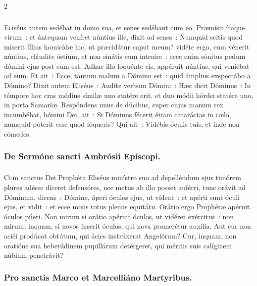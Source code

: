 \documentclass[9pt,twoside]{extarticle}
\begin{document}
\begin{multicols}{2}
{\subsubsection*{\center {}}
\lettrine{E}liséus autem sedébat in domo sua, et senes sedébant cum eo. Præmísit ítaque virum~: et ántequam veníret núntius ille, dixit ad senes~: Numquid scitis quod míserit fílius homicídæ hic, ut præcidátur caput meum? vidéte ergo, cum vénerit núntius, cláudite óstium, et non sinátis eum introíre~: ecce enim sónitus pedum dómini ejus post eum est.
Adhuc illo loquénte eis, appáruit núntius, qui veniébat ad eum. Et ait~: Ecce, tantum malum a Dómino est~: quid ámplius exspectábo a Dómino?
Dixit autem Eliséus~: Audíte verbum Dómini~: Hæc dicit Dóminus~: In témpore hoc cras módius símilæ uno statére erit, et duo módii hórdei statére uno, in porta Samaríæ.
Respóndens unus de dúcibus, super cujus manum rex incumbébat, hómini Dei, ait~: Si Dóminus fécerit étiam cataráctas in cælo, numquid póterit esse quod lóqueris? Qui ait~: Vidébis óculis tuis, et inde non cómedes.

\subsubsection*{\center De Sermóne sancti Ambrósii Epíscopi.}
\subsubsection*{\center {}}
\lettrine{C}um sanctus Dei Prophéta Eliséus minístro suo ad depelléndum ejus timórem plures adésse díceret defensóres, nec metus ab illo posset auférri, tunc orávit ad Dóminum, dicens~: Dómine, áperi óculos ejus, ut vídeat~: et apérti sunt óculi ejus, et vidit~: et ecce mons totus plenus equitátu. Orátio ergo Prophétæ apéruit óculos púeri. Non mirum si orátio apéruit óculos, ut vidéret exércitus~: non mirum, inquam, si novos ínserit óculos, qui nova promerétur auxília. Aut cur non aciéi prodúcat obtútum, qui ácies instrúxerat Angelórum? Cur, inquam, non oratióne sua hebetúdinem pupillárum detérgeret, qui méritis suis calíginem núbium penetrávit?

\begin{tightlist}{}
\item {}
\end{tightlist}

\subsubsection*{\center Pro sanctis Marco et Marcelliáno Martyribus.}
}
\end{multicols}
\end{document}
